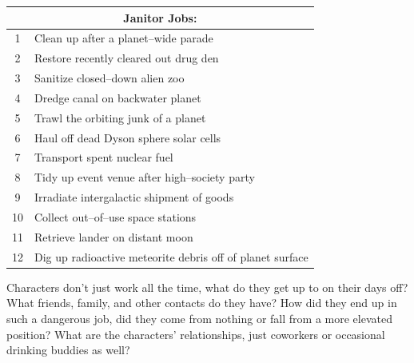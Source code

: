 \documentclass[landscape]{book}
\begin{document}
\begin{multicols*}{4}
\begin{center}
  \begin{tabular}{|c|p{}|}
    \hline \multicolumn{2}{|c|}{Janitor Jobs:} \\
    \hline 1 & Clean up after a planet--wide parade \\
    2 & Restore recently cleared out drug den \\
    3 & Sanitize closed--down alien zoo \\
    4 & Dredge canal on backwater planet \\
    5 & Trawl the orbiting junk of a planet \\
    6 & Haul off dead Dyson sphere solar cells \\
    7 & Transport spent nuclear fuel \\
    8 & Tidy up event venue after high--society party \\
    9 & Irradiate intergalactic shipment of goods \\
    10 & Collect out--of--use space stations \\
    11 & Retrieve lander on distant moon \\
    12 & Dig up radioactive meteorite debris off of planet surface \\ \hline
  \end{tabular}
\end{center}

Characters don't just work all the time, what do they get up to on their days off?
What friends, family, and other contacts do they have?
How did they end up in such a dangerous job, did they come from nothing or fall from a more elevated position?
What are the characters' relationships, just coworkers or occasional drinking buddies as well?

\columnbreak

\end{multicols*}
\end{document}
